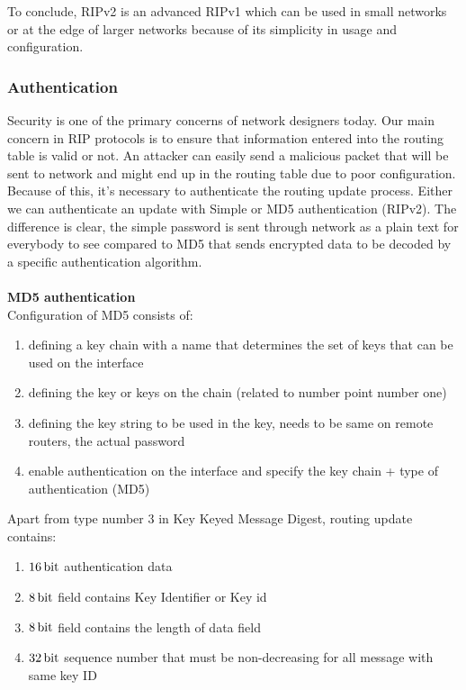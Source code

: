 \documentclass[11pt,a4paper]{article}
\begin{document}
\noindent
To conclude, RIPv2 is an advanced RIPv1 which can be used in small networks or at the edge of larger networks because of its simplicity in usage and configuration.

\subsubsection{Authentication}
\label{sec:auth}
Security is one of the primary concerns of network designers today\cite{auth}. Our main concern in RIP protocols is to ensure that information entered into the routing table is valid or not. An attacker can easily send a malicious packet that will be sent to network and might end up in the routing table due to poor configuration. Because of this, it's necessary to authenticate the routing update process. Either we can authenticate an update with Simple or MD5 authentication (RIPv2). The difference is clear, the simple password is sent through network as a plain text for everybody to see compared to MD5 that sends encrypted data to be decoded by a specific authentication algorithm.
\\ \\
\textbf{MD5 authentication}\\
\noindent
Configuration of MD5 consists of:

\begin{enumerate}
\item defining a key chain with a name that determines the set of keys that can be used on the interface
\item defining the key or keys on the chain (related to number point number one)
\item defining the key string to be used in the key, needs to be same on remote routers, the actual password
\item enable authentication on the interface and specify the key chain + type of authentication (MD5)
\end{enumerate}

\noindent
Apart from type number 3 in Key Keyed Message Digest, routing update contains:
\begin{enumerate}
\item $\SI{16}{\bit}$ authentication data
\item $\SI{8}{\bit}$ field contains Key Identifier or Key id
\item $\SI{8}{\bit}$ field contains the length of data field
\item $\SI{32}{\bit}$ sequence number that must be non-decreasing for all message with same key ID
\end{enumerate}
\end{document}
